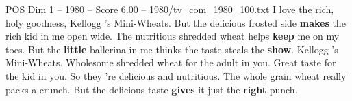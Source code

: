 \begin{textsample}{POS Dim 1 – 1980 – Score 6.00 – 1980/tv\_com\_1980\_100.txt}  \label{ex:f1_pos_042}
I love the rich, holy goodness, Kellogg 's Mini-Wheats.
But the delicious frosted side \textbf{makes} the rich kid in me open wide.
The nutritious shredded wheat helps \textbf{keep} me on my toes.
But the \textbf{little} ballerina in me thinks the taste steals the \textbf{show}.
Kellogg 's Mini-Wheats.
Wholesome shredded wheat for the adult in you.
Great taste for the kid in you.
So they 're delicious and nutritious.
The whole grain wheat really packs a crunch.
But the delicious taste \textbf{gives} it just the \textbf{right} punch.

\end{textsample}
